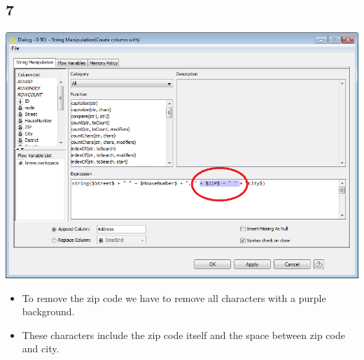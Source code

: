 \documentclass{beamer}
\begin{document}
\subsection{7}
\begin{frame}
	\begin{center}
  		\includegraphics[height=0.6\textheight]{7.png}
	\end{center}
	\begin{itemize}
		\item To remove the zip code we have to remove all characters with a purple background.
		\item These characters include the zip code itself and the space between zip code and city.
	\end{itemize}
\end{frame}
\end{document}
